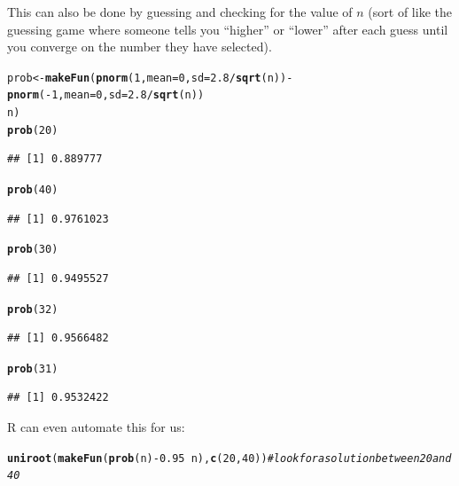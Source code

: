 \documentclass[twoside]{book}\usepackage[]{graphicx}\usepackage[]{xcolor}
\makeatletter
\newcommand{\hlnum}[1]{\textcolor[rgb]{0.686,0.059,0.569}{#1}}%
\newcommand{\hlcom}[1]{\textcolor[rgb]{0.678,0.584,0.686}{\textit{#1}}}%
\newcommand{\hlopt}[1]{\textcolor[rgb]{0,0,0}{#1}}%
\newcommand{\hlstd}[1]{\textcolor[rgb]{0.345,0.345,0.345}{#1}}%
\newcommand{\hlkwb}[1]{\textcolor[rgb]{0.69,0.353,0.396}{#1}}%
\newcommand{\hlkwc}[1]{\textcolor[rgb]{0.333,0.667,0.333}{#1}}%
\newcommand{\hlkwd}[1]{\textcolor[rgb]{0.737,0.353,0.396}{\textbf{#1}}}%
\newenvironment{kframe}{%
 \def\at@end@of@kframe{}%
 \ifinner\ifhmode%
  \def\at@end@of@kframe{\end{minipage}}%
  \begin{minipage}{\columnwidth}%
 \fi\fi%
 \def\FrameCommand##1{\hskip\@totalleftmargin \hskip-\fboxsep
 \colorbox{shadecolor}{##1}\hskip-\fboxsep
     \hskip-\linewidth \hskip-\@totalleftmargin \hskip\columnwidth}%
 \MakeFramed {\advance\hsize-\width
   \@totalleftmargin\z@ \linewidth\hsize
   \@setminipage}}%
 {\par\unskip\endMakeFramed%
 \at@end@of@kframe}
\newenvironment{knitrout}{}{} %
\makeatother
\begin{document}
\begin{solution}
\begin{enumerate}
			 This can also be done by guessing and checking for the value of $n$ (sort of like the 
			 guessing game where someone tells you ``higher'' or ``lower'' after each guess until 
			 you converge on the number they have selected).
\begin{knitrout}
\color{fgcolor}\begin{kframe}
\begin{alltt}
\hlstd{prob} \hlkwb{<-} \hlkwd{makeFun}\hlstd{(}\hlkwd{pnorm}\hlstd{(}\hlnum{1}\hlstd{,} \hlkwc{mean} \hlstd{=} \hlnum{0}\hlstd{,} \hlkwc{sd} \hlstd{=} \hlnum{2.8}\hlopt{/}\hlkwd{sqrt}\hlstd{(n))} \hlopt{-} \hlkwd{pnorm}\hlstd{(}\hlopt{-}\hlnum{1}\hlstd{,} \hlkwc{mean} \hlstd{=} \hlnum{0}\hlstd{,} \hlkwc{sd} \hlstd{=} \hlnum{2.8}\hlopt{/}\hlkwd{sqrt}\hlstd{(n))} \hlopt{~}
    \hlstd{n)}
\hlkwd{prob}\hlstd{(}\hlnum{20}\hlstd{)}
\end{alltt}
\begin{verbatim}
## [1] 0.889777
\end{verbatim}
\begin{alltt}
\hlkwd{prob}\hlstd{(}\hlnum{40}\hlstd{)}
\end{alltt}
\begin{verbatim}
## [1] 0.9761023
\end{verbatim}
\begin{alltt}
\hlkwd{prob}\hlstd{(}\hlnum{30}\hlstd{)}
\end{alltt}
\begin{verbatim}
## [1] 0.9495527
\end{verbatim}
\begin{alltt}
\hlkwd{prob}\hlstd{(}\hlnum{32}\hlstd{)}
\end{alltt}
\begin{verbatim}
## [1] 0.9566482
\end{verbatim}
\begin{alltt}
\hlkwd{prob}\hlstd{(}\hlnum{31}\hlstd{)}
\end{alltt}
\begin{verbatim}
## [1] 0.9532422
\end{verbatim}
\end{kframe}
\end{knitrout}
R can even automate this for us:
\begin{knitrout}
\color{fgcolor}\begin{kframe}
\begin{alltt}
\hlkwd{uniroot}\hlstd{(}\hlkwd{makeFun}\hlstd{(}\hlkwd{prob}\hlstd{(n)} \hlopt{-} \hlnum{0.95} \hlopt{~} \hlstd{n),} \hlkwd{c}\hlstd{(}\hlnum{20}\hlstd{,} \hlnum{40}\hlstd{))}  \hlcom{# look for a solution between 20 and 40}

\end{alltt}
\end{kframe}
\end{knitrout}
\end{enumerate}
\end{solution}
\end{document}
